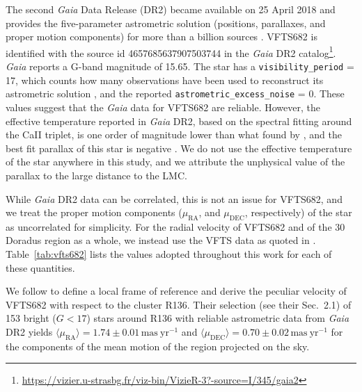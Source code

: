 \documentclass[a4paper,fleqn,usenatbib]{mnras}
\DeclareRobustCommand{\Tabref}[1]{Table~\ref{#1}}
\begin{document}
The second \emph{Gaia} Data Release (DR2)%
became available on 25 April 2018 and 
provides the five-parameter astrometric solution (positions,
parallaxes, and proper motion components) for more than a billion
sources \citep{brown:18}. VFTS682 is identified with the source id 4657685637907503744 in the \emph{Gaia} DR2
catalog\footnote{\url{https://vizier.u-strasbg.fr/viz-bin/VizieR-3?-source=I/345/gaia2}}. \emph{Gaia}
reports a G-band magnitude of 15.65. The star has a
\texttt{visibility\_period} = 17, which counts how many observations have
been used to reconstruct its astrometric solution
\citep[][]{lindengren:18}, and the reported
\texttt{astrometric\_excess\_noise} = 0. These values suggest that the \emph{Gaia}
data for VFTS682 are reliable. However, the effective temperature
reported in \emph{Gaia} DR2, based on the spectral fitting around the
CaII triplet, is one order of magnitude lower than what found by
\cite{bestenlehner:11}, and the best fit parallax of this star is
negative \citep[see, e.g.,][]{hogg:18}. We do not use the effective temperature of the star anywhere
in this study, and we attribute the unphysical value of the parallax
to the large distance to the LMC.%

While \emph{Gaia} DR2 data can be correlated, this is
not an issue for VFTS682, and we treat the proper motion components ($\mu_\mathrm{RA}$, and $\mu_\mathrm{DEC}$,
respectively) of the star as uncorrelated for simplicity.
For the radial velocity of VFTS682 and of the 30 Doradus
region as a whole, we instead use the VFTS data
as quoted in \cite{bestenlehner:11}. \Tabref{tab:vfts682} lists the values adopted throughout
this work for each of these quantities.

We follow \citet{lennon:18} to define a local frame of reference and derive the peculiar velocity
of VFTS682 with respect to the cluster R136. Their selection (see
their Sec.~2.1) of 153
bright ($G<17$) stars around R136 with reliable astrometric data from
\emph{Gaia} DR2 yields $\langle\mu_\mathrm{RA}\rangle=1.74\pm0.01\,\mathrm{mas\
  yr^{-1}}$ and $\langle\mu_\mathrm{DEC}\rangle=0.70\pm0.02\,\mathrm{mas\ yr^{-1}}$
for the components of the mean motion of the region projected on the sky.
\end{document}
